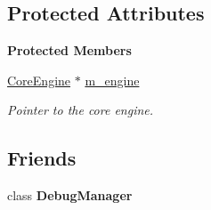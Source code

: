 \subsection*{Protected Attributes}
\begin{Indent}\textbf{ Protected Members}\par
\begin{DoxyCompactItemize}
\item 
\mbox{\label{classrev_1_1_polygon_cache_aaa2d93d949e161381ebf6f37e90628b2}} 
\mbox{\hyperlink{classrev_1_1_core_engine}{Core\+Engine}} $\ast$ \mbox{\hyperlink{classrev_1_1_polygon_cache_aaa2d93d949e161381ebf6f37e90628b2}{m\+\_\+engine}}
\begin{DoxyCompactList}\small\item\em Pointer to the core engine. \end{DoxyCompactList}\end{DoxyCompactItemize}
\end{Indent}
\subsection*{Friends}
\begin{DoxyCompactItemize}
\item 
\mbox{\label{classrev_1_1_polygon_cache_aa81a2e787af81f4fb4b7322fce0b27be}} 
class {\bfseries Debug\+Manager}
\end{DoxyCompactItemize}
